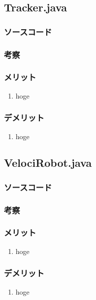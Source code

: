 \documentclass[12pt]{jarticle} %
\begin{document}
\begin{flushleft}
\subsection{Tracker.java}
\subsubsection{ソースコード}

\subsubsection{考察}
\subsubsection{メリット}
\begin{enumerate}
\item hoge
\end{enumerate}
\subsubsection{デメリット}
\begin{enumerate}
\item hoge
\end{enumerate}

\subsection{VelociRobot.java}
\subsubsection{ソースコード}

\subsubsection{考察}
\subsubsection{メリット}
\begin{enumerate}
\item hoge
\end{enumerate}
\subsubsection{デメリット}
\begin{enumerate}
\item hoge
\end{enumerate}


\end{flushleft}
\end{document}
